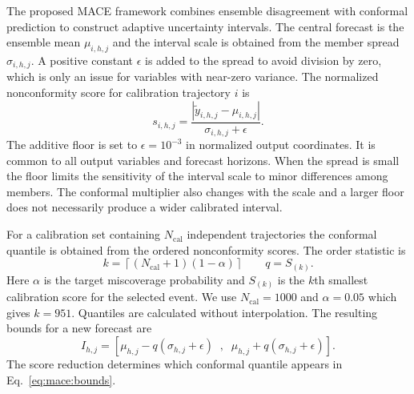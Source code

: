 The proposed MACE framework combines ensemble disagreement with conformal prediction to construct adaptive uncertainty intervals. The central forecast is the ensemble mean $\mu_{i,h,j}$ and the interval scale is obtained from the member spread $\sigma_{i,h,j}$. A positive constant $\epsilon$ is added to the spread to avoid division by zero, which is only an issue for variables with near-zero variance. The normalized nonconformity score for calibration trajectory $i$ is
\begin{equation}
 s_{i,h,j}=
 \frac{\left|\widetilde y_{i,h,j}-\mu_{i,h,j}\right|}
 {\sigma_{i,h,j}+\epsilon}.
 \label{eq:mace:score}
\end{equation}
The additive floor is set to $\epsilon=10^{-3}$ in normalized output coordinates. It is common to all output variables and forecast horizons. When the spread is small the floor limits the sensitivity of the interval scale to minor differences among members. The conformal multiplier also changes with the scale and a larger floor does not necessarily produce a wider calibrated interval.

For a calibration set containing $N_{\mathrm{cal}}$ independent trajectories the conformal quantile is obtained from the ordered nonconformity scores. The order statistic is
\begin{equation}
 k=\left\lceil(N_{\mathrm{cal}}+1)(1-\alpha)\right\rceil
 \qquad
 q=S_{(k)}.
 \label{eq:mace:quantile}
\end{equation}
Here $\alpha$ is the target miscoverage probability and $S_{(k)}$ is the $k$th smallest calibration score for the selected event. We use $N_{\mathrm{cal}}=1000$ and $\alpha=0.05$ which gives $k=951$. Quantiles are calculated without interpolation. The resulting bounds for a new forecast are
\begin{equation}
 I_{h,j}=
 \left[
 \mu_{h,j}-q(\sigma_{h,j}+\epsilon)
 \;\;,\;\;
 \mu_{h,j}+q(\sigma_{h,j}+\epsilon)
 \right].
 \label{eq:mace:bounds}
\end{equation}
The score reduction determines which conformal quantile appears in Eq.~\eqref{eq:mace:bounds}.


